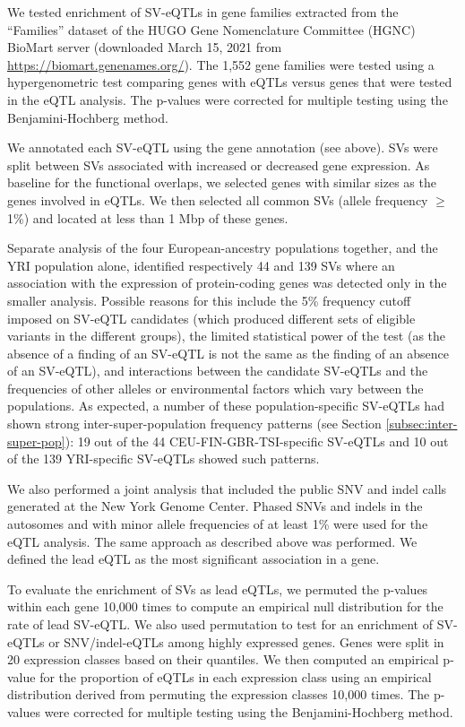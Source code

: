 \documentclass[11pt]{ucscthesis}
\begin{document}
We tested enrichment of SV-eQTLs in gene families extracted from the ``Families'' dataset of the HUGO Gene Nomenclature Committee (HGNC) BioMart server (downloaded March 15, 2021 from \url{https://biomart.genenames.org/}).
The 1,552 gene families were tested using a hypergenometric test comparing genes with eQTLs versus genes that were tested in the eQTL analysis.
The p-values were corrected for multiple testing using the Benjamini-Hochberg method.

We annotated each SV-eQTL using the gene annotation (see above).
SVs were split between SVs associated with increased or decreased gene expression.
As baseline for the functional overlaps, we selected genes with similar sizes as the genes involved in eQTLs.
We then selected all common SVs (allele frequency $\geq$ 1\%) and located at less than 1 Mbp of these genes.

Separate analysis of the four European-ancestry populations together, and the YRI population alone, identified respectively 44 and 139 SVs where an association with the expression of protein-coding genes was detected only in the smaller analysis.
Possible reasons for this include the 5\% frequency cutoff imposed on SV-eQTL candidates (which produced different sets of eligible variants in the different groups), the limited statistical power of the test (as the absence of a finding of an SV-eQTL is not the same as the finding of an absence of an SV-eQTL), and interactions between the candidate SV-eQTLs and the frequencies of other alleles or environmental factors which vary between the populations.
As expected, a number of these population-specific SV-eQTLs had shown strong inter-super-population frequency patterns (see Section \ref{subsec:inter-super-pop}):
19 out of the 44 CEU-FIN-GBR-TSI-specific SV-eQTLs and 10 out of the 139 YRI-specific SV-eQTLs showed such patterns.

We also performed a joint analysis that included the public SNV and indel calls generated at the New York Genome Center\cite{1000gp_nygc_2021}.
Phased SNVs and indels in the autosomes and with minor allele frequencies of at least 1\% were used for the eQTL analysis.
The same approach as described above was performed.
We defined the lead eQTL as the most significant association in a gene.

To evaluate the enrichment of SVs as lead eQTLs, we permuted the p-values within each gene 10,000 times to compute an empirical null distribution for the rate of lead SV-eQTL.
We also used permutation to test for an enrichment of SV-eQTLs or SNV/indel-eQTLs among highly expressed genes.
Genes were split in 20 expression classes based on their quantiles.
We then computed an empirical p-value for the proportion of eQTLs in each expression class using an empirical distribution derived from permuting the expression classes 10,000 times.
The p-values were corrected for multiple testing using the Benjamini-Hochberg method.
\end{document}
